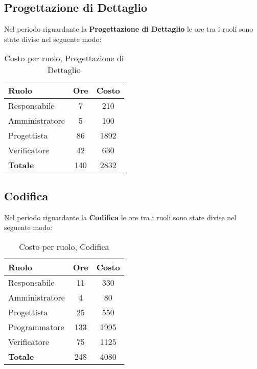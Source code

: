 \subsection{Progettazione di Dettaglio}
Nel periodo riguardante la \textbf{Progettazione di Dettaglio} le ore tra i ruoli sono state divise nel seguente modo:

\begin{table}[H]
	\begin{center}
		\begin{tabular}{|l|c|c|}
			\hline
			\textbf{Ruolo}	& \textbf{Ore} &	\textbf{Costo}	 \\
			\hline
			Responsabile	&	7	&	210		\\
			\hline
			Amministratore	&	5	&	100		\\
			\hline
			Progettista		&	86	&	1892	\\
			\hline
			Verificatore	&	42	&	630		\\
			\hline
			\textbf{Totale}	&	140	&	2832	\\
			\hline
		\end{tabular}
	\end{center}
	\caption{Costo per ruolo, Progettazione di Dettaglio}
\end{table}


\subsection{Codifica}
Nel periodo riguardante la \textbf{Codifica} le ore tra i ruoli sono state divise nel seguente modo:

\begin{table}[H]
	\begin{center}
		\begin{tabular}{|l|c|c|}
			\hline
			\textbf{Ruolo}	& \textbf{Ore} &	\textbf{Costo}	 \\
			\hline
			Responsabile	&	11	&	330		\\
			\hline
			Amministratore	&	4	&	80		\\
			\hline
			Progettista		&	25	&	550		\\
			\hline
			Programmatore	&	133	&	1995	\\
			\hline
			Verificatore	&	75	&	1125	\\
			\hline
			\textbf{Totale}	&	248	&	4080	\\
			\hline
		\end{tabular}
	\end{center}
	\caption{Costo per ruolo, Codifica}
\end{table}

